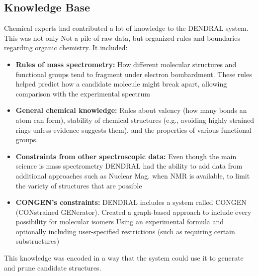 \documentclass[12pt,a4paper]{article}
\begin{document}
\subsection{Knowledge Base}
Chemical experts had contributed a lot of knowledge to the DENDRAL system. This was not only
Not a pile of raw data, but organized rules and boundaries regarding organic chemistry. It
included:\begin{itemize}
    \item \textbf{Rules of mass spectrometry:} How different molecular structures and functional groups tend to fragment under electron bombardment. These rules helped predict how a candidate molecule might break apart, allowing comparison with the experimental spectrum
    \item \textbf{General chemical knowledge:} Rules about valency (how many bonds an atom can form), stability of chemical structures (e.g., avoiding highly strained rings unless evidence suggests them), and the properties of various functional groups.
    \item \textbf{Constraints from other spectroscopic data:} Even though the main science is mass spectrometry
DENDRAL had the ability to add data from additional approaches such as Nuclear Mag.
when NMR is available, to limit the variety of structures that are possible
    \item \textbf{CONGEN's constraints:} DENDRAL includes a system called CONGEN (CONstrained GENerator).
Created a graph-based approach to include every possibility for molecular isomers
Using an experimental formula and optionally including user-specified restrictions (such as requiring certain substructures)
\end{itemize}
This knowledge was encoded in a way that the system could use it to generate and prune candidate structures.
\end{document}
